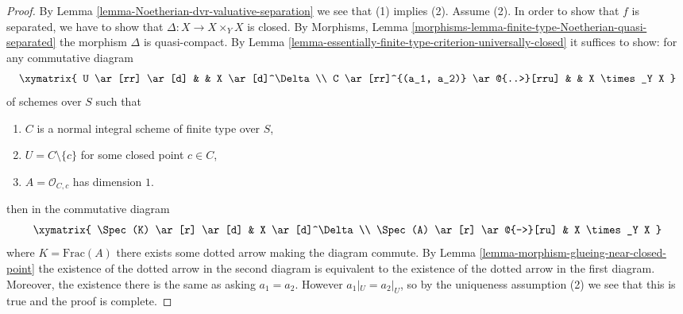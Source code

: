 \begin{proof}
By Lemma \ref{lemma-Noetherian-dvr-valuative-separation} we see that
(1) implies (2). Assume (2). In order to show that $f$ is separated,
we have to show that $\Delta : X \to X \times_Y X$ is closed. By
Morphisms, Lemma \ref{morphisms-lemma-finite-type-Noetherian-quasi-separated}
the morphism $\Delta$ is quasi-compact.
By Lemma \ref{lemma-essentially-finite-type-criterion-universally-closed}
it suffices to show: for any commutative diagram
$$
\xymatrix{
U \ar[rr] \ar[d] & & X \ar[d]^\Delta \\
C \ar[rr]^{(a_1, a_2)} \ar@{..>}[rru] & & X \times_Y X
}
$$
of schemes over $S$ such that
\begin{enumerate}
\item $C$ is a normal integral scheme of finite type over $S$,
\item $U = C \setminus \{c\}$ for some closed point $c \in C$,
\item $A = \mathcal{O}_{C, c}$ has dimension $1$.
\end{enumerate}
then in the commutative diagram
$$
\xymatrix{
\Spec(K) \ar[r] \ar[d] & X \ar[d]^\Delta \\
\Spec(A) \ar[r] \ar@{-->}[ru] & X \times_Y X
}
$$
where $K = \text{Frac}(A)$ there exists some dotted arrow
making the diagram commute. By
Lemma \ref{lemma-morphism-glueing-near-closed-point}
the existence of the dotted arrow in the second diagram
is equivalent to the existence of the dotted arrow
in the first diagram. Moreover, the existence there
is the same as asking $a_1 = a_2$. However $a_1|_U = a_2|_U$, so
by the uniqueness assumption (2) we see that this is true
and the proof is complete.
\end{proof}

